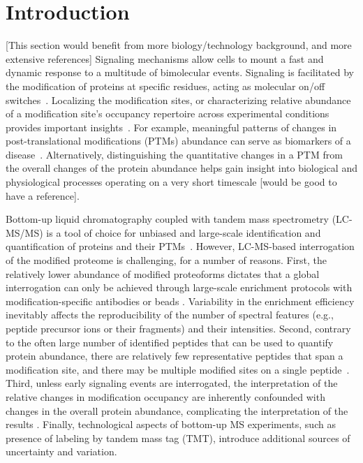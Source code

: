 \documentclass[mcp]{article}
\numberwithin{table}{section}
\def\todo#1{{\color{red}[#1]}}
\begin{document}
\section{Introduction}

\todo{This section would benefit from more biology/technology background, and more extensive references}
Signaling mechanisms allow cells to mount a fast and dynamic response to a multitude of bimolecular events. Signaling is facilitated by the modification of proteins at specific residues, acting as molecular on/off switches~\cite{Deribe,Cohen}. Localizing the modification sites, or characterizing relative abundance of a modification site's occupancy repertoire across experimental conditions provides important insights~\cite{Mann}. For example, meaningful patterns of changes in post-translational modifications (PTMs) abundance can serve as biomarkers of a disease~\cite{Petushkova_2017}. Alternatively, distinguishing the quantitative changes in a PTM from the overall changes of the protein abundance helps gain insight into biological and physiological processes operating on a very short timescale \todo{would be good to have a reference}.

Bottom-up liquid chromatography coupled with tandem mass spectrometry (LC-MS/MS) is a tool of choice for unbiased and large-scale identification and quantification of proteins and their PTMs~\cite{Kall:2011ub,Roepstorff}. However, LC-MS-based interrogation of the modified proteome is challenging, for a number of reasons. First, the relatively lower abundance of modified proteoforms dictates that a global interrogation can only be achieved through large-scale enrichment protocols with modification-specific antibodies or beads \cite{Huang:2014}. Variability in the enrichment efficiency inevitably affects the reproducibility of the number of spectral features (e.g., peptide precursor ions or their fragments) and their intensities. Second, contrary to the often large number of identified peptides that can be used to quantify protein abundance, there are relatively few representative peptides that span a modification site, and there may be multiple modified sites on a single peptide~\cite{Mann}. Third, unless early signaling events are interrogated, the interpretation of the relative changes in modification occupancy are inherently confounded with changes in the overall protein abundance, complicating the interpretation of the results \cite{Olsen:2013}. Finally, technological aspects of bottom-up MS experiments, such as presence of labeling by tandem mass tag (TMT), introduce additional sources of uncertainty and variation.
\end{document}
